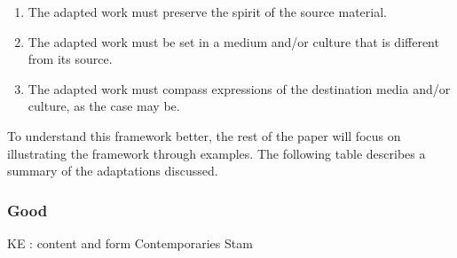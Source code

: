 \documentclass[12pt]{article}
\begin{document}
\begin{enumerate}
\item The adapted work must preserve the spirit of the source material.
\item The adapted work must be set in a medium and/or culture that is different
from its source.
\item The adapted work must compass expressions of the destination media and/or
culture, as the case may be.
\end{enumerate}

To understand this framework better, the rest of the paper will focus on
illustrating the framework through examples.
The following table describes a summary of the adaptations discussed.

\pagebreak
\subsubsection*{Good}
\pagebreak
KE : content and form
Contemporaries 
Stam 
\end{document}

